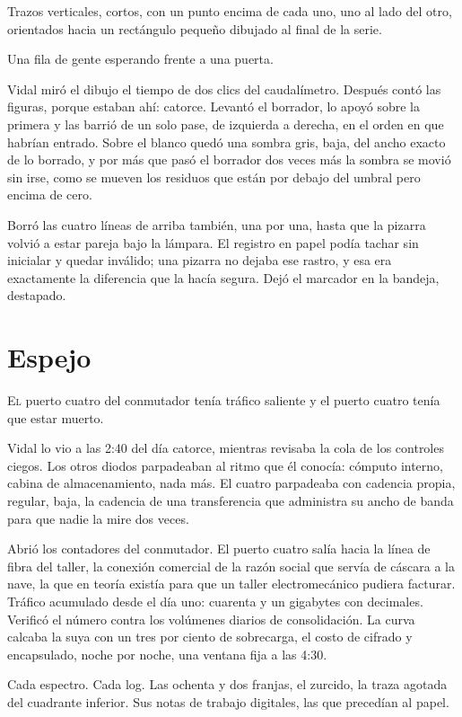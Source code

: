 Trazos verticales, cortos, con un punto encima de cada uno, uno al lado del otro, orientados hacia un rectángulo pequeño dibujado al final de la serie.

Una fila de gente esperando frente a una puerta.

Vidal miró el dibujo el tiempo de dos clics del caudalímetro. Después contó las figuras, porque estaban ahí: catorce. Levantó el borrador, lo apoyó sobre la primera y las barrió de un solo pase, de izquierda a derecha, en el orden en que habrían entrado. Sobre el blanco quedó una sombra gris, baja, del ancho exacto de lo borrado, y por más que pasó el borrador dos veces más la sombra se movió sin irse, como se mueven los residuos que están por debajo del umbral pero encima de cero.

Borró las cuatro líneas de arriba también, una por una, hasta que la pizarra volvió a estar pareja bajo la lámpara. El registro en papel podía tachar sin inicialar y quedar inválido; una pizarra no dejaba ese rastro, y esa era exactamente la diferencia que la hacía segura. Dejó el marcador en la bandeja, destapado.

\clearpage

\chapter{Espejo}

\lettrine[lines=2, lhang=0.1, nindent=0.2em]{E}{l} puerto cuatro del conmutador tenía tráfico saliente y el puerto cuatro tenía que estar muerto.


Vidal lo vio a las 2:40 del día catorce, mientras revisaba la cola de los controles ciegos. Los otros diodos parpadeaban al ritmo que él conocía: cómputo interno, cabina de almacenamiento, nada más. El cuatro parpadeaba con cadencia propia, regular, baja, la cadencia de una transferencia que administra su ancho de banda para que nadie la mire dos veces.

Abrió los contadores del conmutador. El puerto cuatro salía hacia la línea de fibra del taller, la conexión comercial de la razón social que servía de cáscara a la nave, la que en teoría existía para que un taller electromecánico pudiera facturar. Tráfico acumulado desde el día uno: cuarenta y un gigabytes con decimales. Verificó el número contra los volúmenes diarios de consolidación. La curva calcaba la suya con un tres por ciento de sobrecarga, el costo de cifrado y encapsulado, noche por noche, una ventana fija a las 4:30.

Cada espectro. Cada log. Las ochenta y dos franjas, el zurcido, la traza agotada del cuadrante inferior. Sus notas de trabajo digitales, las que precedían al papel.

